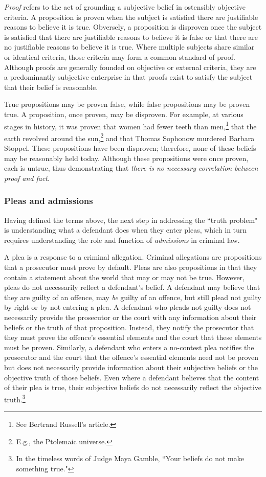 \textit{Proof} refers to the act of grounding a subjective belief in ostensibly objective criteria. A proposition is proven when the subject is satisfied there are justifiable reasons to believe it is true. Obversely, a proposition is disproven once the subject is satisfied that there are justifiable reasons to believe it is false or that there are no justifiable reasons to believe it is true. Where multiple subjects share similar or identical criteria, those criteria may form a common standard of proof. Although proofs are generally founded on objective or external criteria, they are a predominantly subjective enterprise in that proofs exist to satisfy the subject that their belief is reasonable. 

True propositions may be proven false, while false propositions may be proven true. A proposition, once proven, may be disproven. For example, at various stages in history, it was proven that women had fewer teeth than men,\footnote{See Bertrand Russell's article.} that the earth revolved around the sun,\footnote{E.g., the Ptolemaic universe.} and that Thomas Sophonow murdered Barbara Stoppel. These propositions have been disproven; therefore, none of these beliefs may be reasonably held today. Although these propositions were once proven, each is untrue, thus demonstrating that \textit{there is no necessary correlation between proof and fact}.

\subsubsection{Pleas and admissions}

Having defined the terms above, the next step in addressing the ``truth problem" is understanding what a defendant does when they enter pleas, which in turn requires understanding the role and function of \textit{admissions} in criminal law. 

A plea is a response to a criminal allegation. Criminal allegations are propositions that a prosecutor must prove by default. Pleas are also propositions in that they contain a statement about the world that may or may not be true. However, pleas do not necessarily reflect a defendant's belief. A defendant may believe that they are guilty of an offence, may \textit{be} guilty of an offence, but still plead not guilty by right or by not entering a plea. A defendant who pleads not guilty does not necessarily provide the prosecutor or the court with any information about their beliefs or the truth of that proposition. Instead, they notify the prosecutor that they must prove the offence's essential elements and the court that these elements must be proven. Similarly, a defendant who enters a no-contest plea notifies the prosecutor and the court that the offence's essential elements need not be proven but does not necessarily provide information about their subjective beliefs or the objective truth of those beliefs. Even where a defendant believes that the content of their plea is true, their subjective beliefs do not necessarily reflect the objective truth.\footnote{In the timeless words of Judge Maya Gamble, ``Your beliefs do not make something true."}


